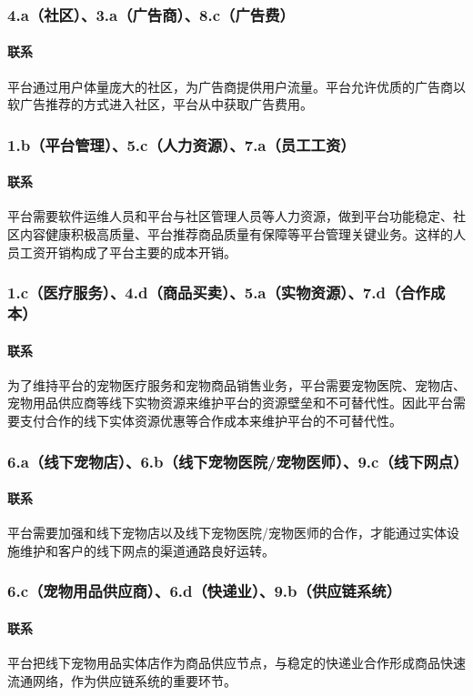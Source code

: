 \documentclass[a4paper]{ctexart}
\begin{document}
\subsubsection{4.a（社区）、3.a（广告商）、8.c（广告费）}
\paragraph{联系}平台通过用户体量庞大的社区，为广告商提供用户流量。平台允许优质的广告商以软广告推荐的方式进入社区，平台从中获取广告费用。
\subsubsection{1.b（平台管理）、5.c（人力资源）、7.a（员工工资）}
\paragraph{联系}平台需要软件运维人员和平台与社区管理人员等人力资源，做到平台功能稳定、社区内容健康积极高质量、平台推荐商品质量有保障等平台管理关键业务。这样的人员工资开销构成了平台主要的成本开销。
\subsubsection{1.c（医疗服务）、4.d（商品买卖）、5.a（实物资源）、7.d（合作成本）}
\paragraph{联系}为了维持平台的宠物医疗服务和宠物商品销售业务，平台需要宠物医院、宠物店、宠物用品供应商等线下实物资源来维护平台的资源壁垒和不可替代性。因此平台需要支付合作的线下实体资源优惠等合作成本来维护平台的不可替代性。
\subsubsection{6.a（线下宠物店）、6.b（线下宠物医院/宠物医师）、9.c（线下网点）}
\paragraph{联系}平台需要加强和线下宠物店以及线下宠物医院/宠物医师的合作，才能通过实体设施维护和客户的线下网点的渠道通路良好运转。
\subsubsection{6.c（宠物用品供应商）、6.d（快递业）、9.b（供应链系统）}
\paragraph{联系}平台把线下宠物用品实体店作为商品供应节点，与稳定的快递业合作形成商品快速流通网络，作为供应链系统的重要环节。
\end{document}
